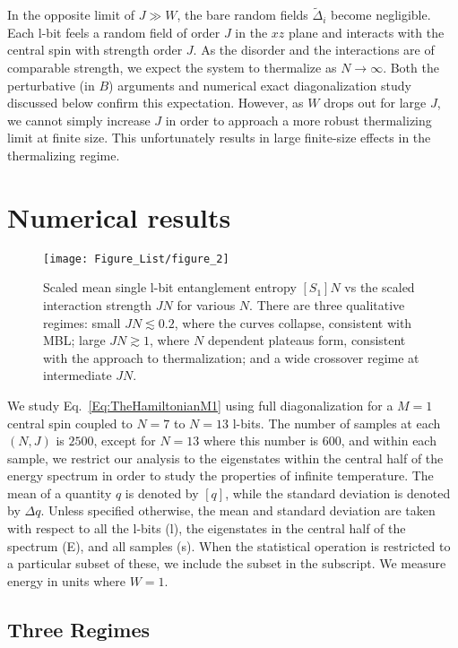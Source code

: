 \documentclass[aps,pra,twocolumn,a4paper,showpacs,superscriptaddress,floatfix,10pt]{revtex4}
\begin{document}
In the opposite limit of $J \gg W$, the bare random fields $\tilde{\Delta}_i$ become negligible.
Each l-bit feels a random field of order $J$ in the $xz$ plane and interacts with the central spin with strength order $J$.
As the disorder and the interactions are of comparable strength, we expect the system to thermalize as $N \to \infty$.
%
Both the perturbative (in $B$) arguments and numerical exact diagonalization study discussed below confirm this expectation.
%
However, as $W$ drops out for large $J$, we cannot simply increase $J$ in order to approach a more robust thermalizing limit at finite size.
This unfortunately results in large finite-size effects in the thermalizing regime.

\section{Numerical results}
\label{sec:numerics}

\begin{figure}[tb]
\texttt{[image: Figure\_List/figure\_2]}
\caption{Scaled mean single l-bit entanglement entropy $[S_1]N$ vs the scaled interaction strength $JN$ for various $N$.
There are three qualitative regimes:
small $JN \lesssim 0.2$, where the curves collapse, consistent with MBL;
large $JN \gtrsim 1$, where $N$ dependent plateaus form, consistent with the approach to thermalization;
and a wide crossover regime at intermediate $JN$.
}
\label{fig:S1N_JN_loglog}
\end{figure}


We study Eq.~\eqref{Eq:TheHamiltonianM1} using full diagonalization for a $M=1$ central spin coupled to $N = 7$ to $N=13$ l-bits.
The number of samples at each $(N,J)$ is $2500$, except for $N=13$ where this number is $600$, and within each sample, we restrict our analysis to the eigenstates within the central half of the energy spectrum in order to study the properties of infinite temperature.
The mean of a quantity $q$ is denoted by $[q]$, while the standard deviation is denoted by $\Delta q$.
Unless specified otherwise, the mean and standard deviation are taken with respect to all the l-bits (l), the eigenstates in the central half of the spectrum (E), and all samples (s).
When the statistical operation is restricted to a particular subset of these, we include the subset in the subscript.
We measure energy in units where $W=1$.


\subsection{Three Regimes} %
\label{sub:numerics_three_regimes}
\end{document}
